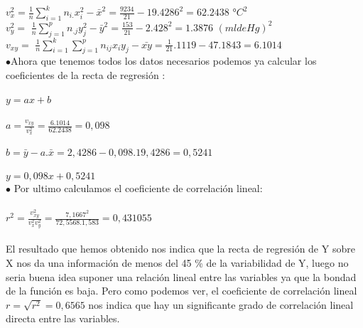 \documentclass{article}
\begin{document}
	
	
		 $v_{x}^{2} =  $$\frac{1}{n}\sum^{k}_{i=1}n_{i.}x_{i}^{2} - \bar{x}^{2} = \frac{9234}{21} - 19.4286^{2} = 62.2438 $ $ °C^{2} $ \\
	 
	 $v_{y}^{2} = $ $\frac{1}{n}\sum^{p}_{j=1}n_{.j}y_{j}^{2} - \bar{y}^{2} = \frac{153}{21} - 2.428^{2} = 1.3876 $ $(ml de Hg)^{2}$ \\
	 
	  $v_{xy} = $ $\frac{1}{n}\sum^{k}_{i=1}\sum^{p}_{j=1}n_{ij}x_{i}y_{j} - \bar{xy}= \frac{1}{21}.1119 - 47.1843 = 6.1014 $ \\
	
	  
	  $\bullet$Ahora que tenemos todos los datos necesarios podemos ya calcular los coeficientes de la recta de regresión :\\ \\
	  $y = ax +b $\\ \\
	  $a = \frac{v_{xy}}{v_{x}^{2}} = \frac{6.1014}{62.2438} = 0,098$\\ \\
	  $b = \bar{y} - a.\bar{x} = 2,4286 - 0,098 .19,4286 = 0,5241$\\ \\
	  $y = 0,098x + 0,5241 $\\ 
	  
	  $\bullet$ Por ultimo calculamos el coeficiente de correlación lineal:\\ \\
	  
	  $r^{2} = \frac{v_{xy}^{2}}{v_{x}^{2}v_{y}^{2}} = \frac{7,1667^{2}}{72,5568 . 1,583} = 0,431055$\\ \\
	  El resultado que hemos obtenido nos indica que la recta de regresión de Y sobre X nos da una información de menos
	  del 45 \% de la variabilidad de Y, luego no seria buena idea suponer una relación lineal entre las variables ya que la bondad de la función es baja. 
	  Pero como podemos ver, el coeficiente de correlación lineal $r = \sqrt{r^{2}} = 0, 6565$ nos indica que hay un significante grado de correlación lineal directa entre las variables.
\end{document}
